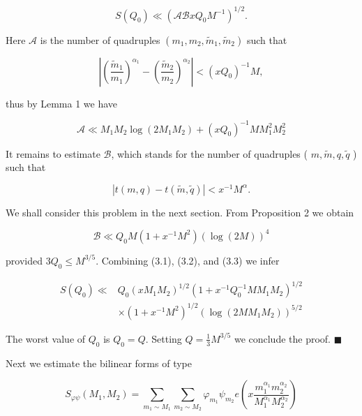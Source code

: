 \documentclass[10pt]{article}
\begin{document}
\begin{equation*}
S\left(Q_{0}\right)\ll\left(\mathscr{A} \mathscr{B} x Q_{0} M^{-1}\right)^{1 / 2} . \tag{3.1}
\end{equation*}


Here $\mathscr{A}$ is the number of quadruples $\left(m_{1}, m_{2}, \tilde{m}_{1}, \tilde{m}_{2}\right)$ such that

$$
\left|\left(\frac{\tilde{m}_{1}}{m_{1}}\right)^{\alpha_{1}}-\left(\frac{\tilde{m}_{2}}{m_{2}}\right)^{\alpha_{2}}\right|<\left(x Q_{0}\right)^{-1} M,
$$

thus by Lemma 1 we have


\begin{equation*}
\mathscr{A} \ll M_{1} M_{2} \log\left(2 M_{1} M_{2}\right)+\left(x Q_{0}\right)^{-1} M M_{1}^{2} M_{2}^{2} \tag{3.2}
\end{equation*}


It remains to estimate $\mathscr{B}$, which stands for the number of quadruples ( $m, \tilde{m}, q, \tilde{q}$ ) such that

$$
|t(m, q)-t(\tilde{m}, \tilde{q})|<x^{-1} M^{\alpha} .
$$

We shall consider this problem in the next section. From Proposition 2 we obtain


\begin{equation*}
\mathscr{B} \ll Q_{0} M\left(1+x^{-1} M^{2}\right)(\log(2 M))^{4} \tag{3.3}
\end{equation*}


provided $3 Q_{0} \leqslant M^{3 / 5}$. Combining (3.1), (3.2), and (3.3) we infer

$$
\begin{aligned}
S\left(Q_{0}\right) \ll & Q_{0}\left(x M_{1} M_{2}\right)^{1 / 2}\left(1+x^{-1} Q_{0}^{-1} M M_{1} M_{2}\right)^{1 / 2} \\
& \times\left(1+x^{-1} M^{2}\right)^{1 / 2}\left(\log\left(2 M M_{1} M_{2}\right)\right)^{5 / 2}
\end{aligned}
$$

The worst value of $Q_{0}$ is $Q_{0}=Q$. Setting $Q=\frac{1}{3} M^{3 / 5}$ we conclude the proof. \(\blacksquare\)

Next we estimate the bilinear forms of type

$$
S_{\varphi \psi}\left(M_{1}, M_{2}\right)=\sum_{m_{1} \sim M_{1}} \sum_{m_{2} \sim M_{2}} \varphi_{m_{1}} \psi_{m_{2}} e\left(x \frac{m_{1}^{\alpha_{1}} m_{2}^{\alpha_{2}}}{M_{1}^{\alpha_{1}} M_{2}^{\alpha_{2}}}\right)
$$
\end{document}
